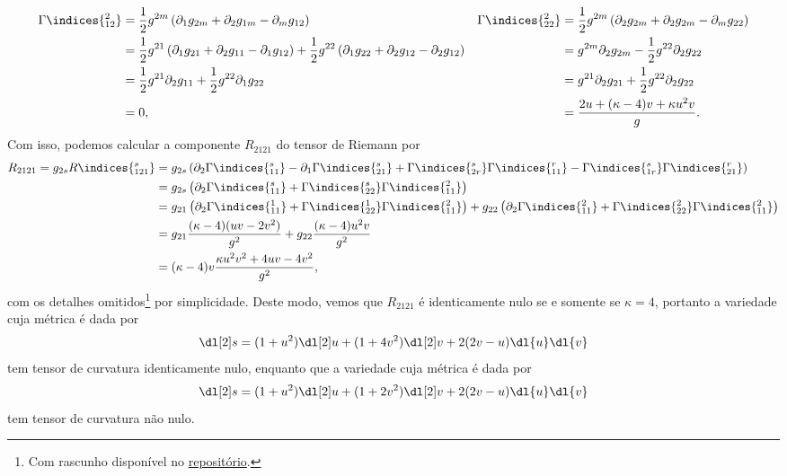 \begin{align*}
    \Gamma\indices{^2_{12}} &= \frac12g^{2m}\left(\partial_1 g_{2m} + \partial_2 g_{1m} - \partial_m g_{12}\right)&
    \Gamma\indices{^2_{22}} &= \frac12g^{2m}\left(\partial_2 g_{2m} + \partial_2 g_{2m} - \partial_m g_{22}\right)\\
                            &= \frac12 g^{21}\left(\partial_1 g_{21} + \partial_2 g_{11} - \partial_1 g_{12}\right) + \frac12g^{22}\left(\partial_1g_{22} + \partial_2 g_{12} - \partial_2 g_{12}\right)&
                            &= g^{2m} \partial_2 g_{2m} - \frac12 g^{22} \partial_2 g_{22}\\
                            &= \frac12 g^{21}\partial_2 g_{11} + \frac12 g^{22}\partial_1g_{22}&
                            &= g^{21}\partial_2 g_{21} + \frac12g^{22}\partial_2 g_{22}\\
                            &= 0,&
                            &= \frac{2u + (\kappa - 4)v + \kappa u^2v}{g}.
\end{align*}
Com isso, podemos calcular a componente \(R_{2121}\) do tensor de Riemann por
\begin{align*}
    R_{2 1 2 1} = g_{2 s}R\indices{^s_{1 2 1}} &= g_{2 s} \left( \partial_{2}\Gamma\indices{^{s}_{11}}- \partial_{1}\Gamma\indices{^{s}_{21}} + \Gamma\indices{^s_{2r}} \Gamma\indices{^r_{11}} - \Gamma\indices{^s_{1r}} \Gamma\indices{^r_{21}} \right)\\
                                               &= g_{2 s} \left( \partial_{2}\Gamma\indices{^{s}_{11}} + \Gamma\indices{^s_{22}} \Gamma\indices{^2_{11}}\right)\\
                                               &= g_{2 1} \left( \partial_{2}\Gamma\indices{^{1}_{11}} + \Gamma\indices{^1_{22}} \Gamma\indices{^2_{11}}\right) + g_{2 2} \left( \partial_{2}\Gamma\indices{^{2}_{11}} + \Gamma\indices{^2_{22}} \Gamma\indices{^2_{11}}\right)\\
                                               &= g_{21}\frac{(\kappa-4)(uv - 2v^2)}{g^2} + g_{22} \frac{(\kappa - 4)u^2v}{g^2}\\
                                               &= (\kappa-4)v\frac{\kappa u^2 v^2 + 4 uv - 4v^2}{g^2},
\end{align*}
com os detalhes omitidos\footnote{Com rascunho disponível no \href{https://github.com/louisradial/4300337-relatividade/blob/main/lista4/rascunho_exercício_2.pdf}{repositório}.} por simplicidade. Deste modo, vemos que \(R_{2121}\) é identicamente nulo se e somente se \(\kappa = 4\), portanto a variedade cuja métrica é dada por
\begin{equation*}
    \dl[2]s = (1+u^2)\dl[2]u + (1+4v^2)\dl[2]v + 2(2v-u)\dl{u}\dl{v}
\end{equation*}
tem tensor de curvatura identicamente nulo, enquanto que a variedade cuja métrica é dada por
\begin{equation*}
    \dl[2]s = (1+u^2)\dl[2]u + (1+2v^2)\dl[2]v + 2(2v-u)\dl{u}\dl{v}
\end{equation*}
tem tensor de curvatura não nulo.
